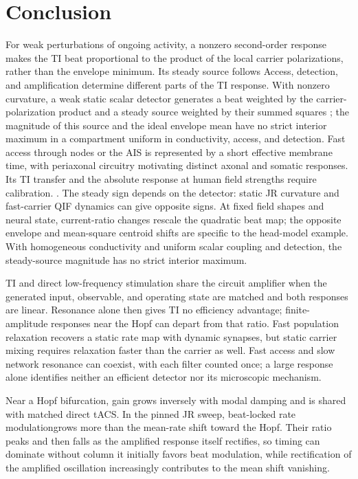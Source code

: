 \documentclass[11pt,a4paper]{article}
\providecommand{\DIFaddtex}[1]{{\protect\color{blue} \sf #1}} %
\providecommand{\DIFdeltex}[1]{{\protect\color{red} \scriptsize #1}} %
\providecommand{\DIFaddbegin}{} %
\providecommand{\DIFaddend}{} %
\providecommand{\DIFdelbegin}{} %
\providecommand{\DIFdelend}{} %
\providecommand{\DIFadd}[1]{\texorpdfstring{\DIFaddtex{#1}}{#1}} %
\providecommand{\DIFdel}[1]{\texorpdfstring{\DIFdeltex{#1}}{}} %
\begin{document}
\DIFaddbegin \FloatBarrier
\DIFaddend \section{Conclusion}
\DIFdelbegin \DIFdel{For weak perturbations of ongoing activity, a nonzero second-order response makes
the TI beat proportional to the product of the local carrier polarizations,
rather than the envelope minimum. Its steady source follows }\DIFdelend \DIFaddbegin \DIFadd{Access, detection, and amplification determine different parts of the TI response. With nonzero curvature, a weak static
scalar detector generates a beat weighted by the carrier-polarization product
and a steady source weighted by }\DIFaddend their summed squares\DIFdelbegin \DIFdel{;
the magnitude of this source and the ideal envelope mean have no strict interior
maximum in a compartment uniform in conductivity, access, and detection. Fast access through nodes or the AIS is represented by a short effective membrane time, with periaxonal circuitry
motivating distinct axonal and somatic responses. Its TI transfer and the absolute
response at human field strengths require calibration.
}\DIFdelend \DIFaddbegin \DIFadd{. The steady sign depends on the detector: static JR
curvature and fast-carrier QIF dynamics can give opposite signs. At fixed
field shapes and neural state, current-ratio changes rescale the quadratic beat map; the opposite
envelope and mean-square centroid shifts are specific to the head-model example.
With homogeneous conductivity and uniform scalar coupling and detection,
the steady-source magnitude has no strict interior maximum.
}\DIFaddend

\DIFdelbegin \DIFdel{TI and direct low-frequency stimulation share the circuit amplifier when the generated input, observable, and operating state are matched and both responses
are linear. Resonance alone then gives TI no efficiency advantage; finite-amplitude
responses near the Hopf can depart from that ratio.
Fast population relaxation
recovers a static rate map with dynamic synapses,
but static carrier mixing
requires relaxation faster than the carrier as well.
Fast access and slow network
resonance can coexist, with each filter counted once; a large response alone
identifies neither an efficient detector nor its microscopic mechanism. }%

\DIFdelend \DIFaddbegin \DIFadd{Near a Hopf bifurcation, gain grows inversely with modal damping and is shared
with matched direct tACS. }\DIFaddend In the pinned JR \DIFdelbegin \DIFdel{sweep, beat-locked rate modulationgrows more than the mean-rate
shift toward the Hopf. Their ratio peaks and then falls as the amplified response
itself rectifies, so timing can dominate without }\DIFdelend \DIFaddbegin \DIFadd{column it initially
favors beat modulation, while rectification of the amplified oscillation
increasingly contributes to }\DIFaddend the mean shift\DIFdelbegin \DIFdel{vanishing.
}%
\end{document}
